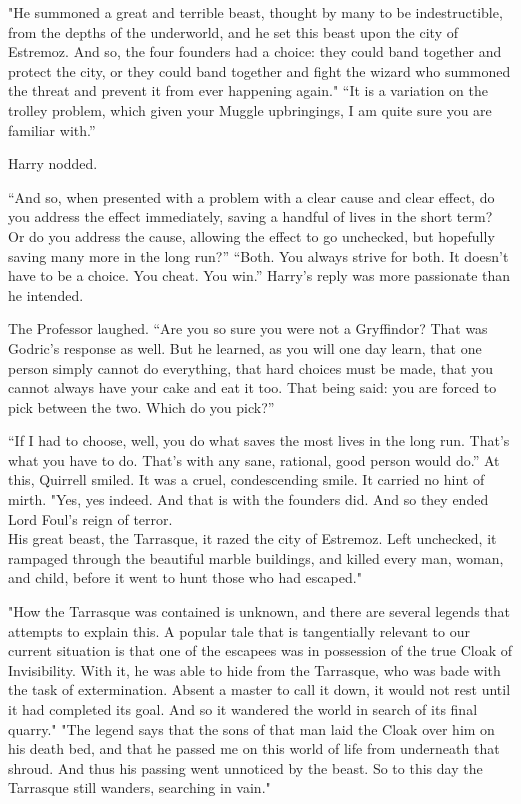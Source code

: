 "He summoned a great and terrible beast, thought by many to be indestructible, from the depths of the underworld, and he set this beast upon the city of Estremoz. And so, the four founders had a choice: they could band together and protect the city, or they could band together and fight the wizard who summoned the threat and prevent it from ever happening again."
\SmallVSpace
“It is a variation on the trolley problem, which given your Muggle upbringings, I am quite sure you are familiar with.”

Harry nodded.

“And so, when presented with a problem with a clear cause and clear effect, do you address the effect immediately, saving a handful of lives in the short term? Or do you address the cause, allowing the effect to go unchecked, but hopefully saving many more in the long run?”
\SmallVSpace
“Both. You always strive for both. It doesn’t have to be a choice. You cheat. You win.” Harry’s reply was more passionate than he intended.

The Professor laughed. “Are you so sure you were not a Gryffindor? That was Godric’s response as well. But he learned, as you will one day learn, that one person simply cannot do everything, that hard choices must be made, that you cannot always have your cake and eat it too. That being said: you are forced to pick between the two. Which do you pick?”

“If I had to choose, well, you do what saves the most lives in the long run. That’s what you have to do. That’s with any sane, rational, good person would do.”
\SmallVSpace
At this, Quirrell smiled. It was a cruel, condescending smile. It carried no hint of mirth. "Yes, yes indeed. And that is with the founders did. And so they ended Lord Foul’s reign of terror.\\His great beast, the Tarrasque, it razed the city of Estremoz. Left unchecked, it rampaged through the beautiful marble buildings, and killed every man, woman, and child, before it went to hunt those who had escaped."

"How the Tarrasque was contained is unknown, and there are several legends that attempts to explain this. A popular tale that is tangentially relevant to our current situation is that one of the escapees was in possession of the true Cloak of Invisibility. With it, he was able to hide from the Tarrasque, who was bade with the task of extermination. Absent a master to call it down, it would not rest until it had completed its goal. And so it wandered the world in search of its final quarry."
\SmallVSpace
"The legend says that the sons of that man laid the Cloak over him on his death bed, and that he passed me on this world of life from underneath that shroud. And thus his passing went unnoticed by the beast. So to this day the Tarrasque still wanders, searching in vain."


